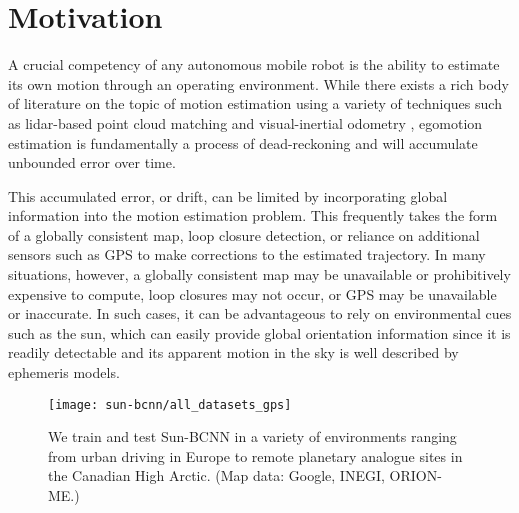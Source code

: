 \section{Motivation}
A crucial competency of any autonomous mobile robot is the ability to estimate its own motion through an operating environment.
While there exists a rich body of literature on the topic of motion estimation using a variety of techniques such as lidar-based point cloud matching \citep{Zhang2015} and visual-inertial odometry \citep{Leutenegger2015-fk}, egomotion estimation is fundamentally a process of dead-reckoning and will accumulate unbounded error over time.


This accumulated error, or drift, can be limited by incorporating global information into the motion estimation problem.
This frequently takes the form of a globally consistent map, loop closure detection, or reliance on additional sensors such as GPS to make corrections to the estimated trajectory.
In many situations, however, a globally consistent map may be unavailable or prohibitively expensive to compute, loop closures may not occur, or GPS may be unavailable or inaccurate.
In such cases, it can be advantageous to rely on environmental cues such as the sun, which can easily provide global orientation information since it is readily detectable and its apparent motion in the sky is well described by ephemeris models.


\begin{figure}
    \centering
    \texttt{[image: sun-bcnn/all\_datasets\_gps]}
    \caption{We train and test Sun-BCNN in a variety of environments ranging from urban driving in Europe to remote planetary analogue sites in the Canadian High Arctic. (Map data: Google, INEGI, ORION-ME.)}
    \label{fig:sun-bcnn_global-gps}
\end{figure}





